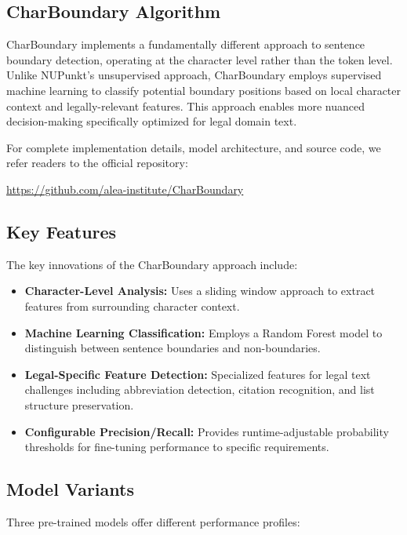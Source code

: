 \subsection{CharBoundary Algorithm}
\label{appendix:CharBoundary}

CharBoundary implements a fundamentally different approach to sentence boundary detection, operating at the character level rather than the token level. Unlike NUPunkt's unsupervised approach, CharBoundary employs supervised machine learning to classify potential boundary positions based on local character context and legally-relevant features. This approach enables more nuanced decision-making specifically optimized for legal domain text.

For complete implementation details, model architecture, and source code, we refer readers to the official repository:

\begin{center}
\url{https://github.com/alea-institute/CharBoundary}
\end{center}

\subsection{Key Features}

The key innovations of the CharBoundary approach include:

\begin{itemize}
\item \textbf{Character-Level Analysis:} Uses a sliding window approach to extract features from surrounding character context.
\item \textbf{Machine Learning Classification:} Employs a Random Forest model to distinguish between sentence boundaries and non-boundaries.
\item \textbf{Legal-Specific Feature Detection:} Specialized features for legal text challenges including abbreviation detection, citation recognition, and list structure preservation.
\item \textbf{Configurable Precision/Recall:} Provides runtime-adjustable probability thresholds for fine-tuning performance to specific requirements.
\end{itemize}

\subsection{Model Variants}

Three pre-trained models offer different performance profiles:

